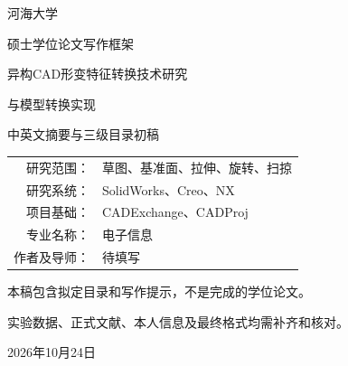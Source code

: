 \begin{titlepage}
\thispagestyle{empty}
\begin{center}
\vspace*{16mm}
{\heiti{}河海大学\par}
\vspace{8mm}
{\songti{}硕士学位论文写作框架\par}
\vspace{22mm}
{\heiti{}异构CAD形变特征转换技术研究\par 与模型转换实现\par}
\vspace{10mm}
{\songti{}中英文摘要与三级目录初稿\par}
\vspace{18mm}
{\songti{}
\begin{tabular}{rl}
研究范围：& 草图、基准面、拉伸、旋转、扫掠\\[6pt]
研究系统：& SolidWorks、Creo、NX\\[6pt]
项目基础：& CADExchange、CADProj\\[6pt]
专业名称：& 电子信息\\[6pt]
作者及导师：& 待填写
\end{tabular}\par}
\vfill
{\small 本稿包含拟定目录和写作提示，不是完成的学位论文。\par
实验数据、正式文献、本人信息及最终格式均需补齐和核对。\par}
\vspace{8mm}
{\songti{}2026年10月24日\par}
\vspace*{8mm}
\end{center}
\end{titlepage}
